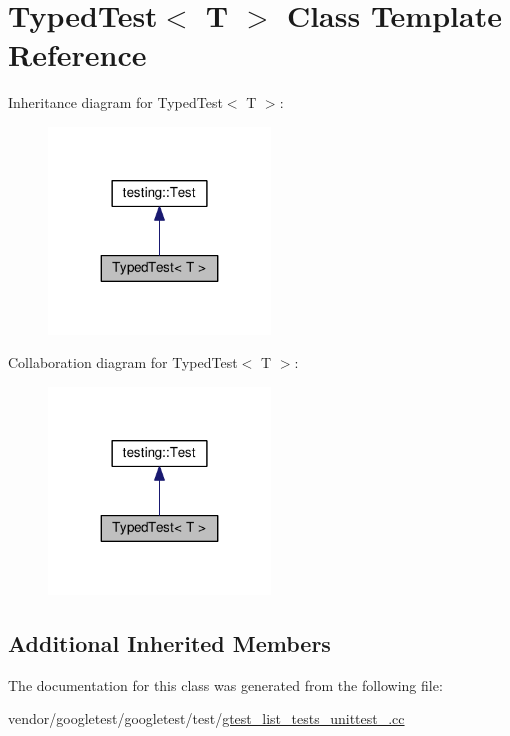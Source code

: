 \hypertarget{classTypedTest}{}\section{Typed\+Test$<$ T $>$ Class Template Reference}
\label{classTypedTest}


Inheritance diagram for Typed\+Test$<$ T $>$\+:\nopagebreak
\begin{figure}[H]
\begin{center}
\leavevmode
\includegraphics[width=167pt]{classTypedTest__inherit__graph}
\end{center}
\end{figure}


Collaboration diagram for Typed\+Test$<$ T $>$\+:\nopagebreak
\begin{figure}[H]
\begin{center}
\leavevmode
\includegraphics[width=167pt]{classTypedTest__coll__graph}
\end{center}
\end{figure}
\subsection*{Additional Inherited Members}


The documentation for this class was generated from the following file\+:\begin{DoxyCompactItemize}
\item 
vendor/googletest/googletest/test/\hyperlink{gtest__list__tests__unittest___8cc}{gtest\+\_\+list\+\_\+tests\+\_\+unittest\+\_\+.\+cc}\end{DoxyCompactItemize}
